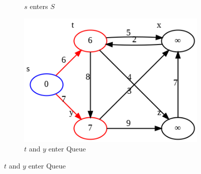 \documentclass[../main.tex]{subfiles}
\begin{document}
\begin{figure}[!ht]
\begin{subfigure}{.32\textwidth}
    \caption{$s$ enters $S$}
    \end{subfigure}
    \begin{subfigure}{.32\textwidth}
    \includegraphics[width=0.99\columnwidth]{fig/dijkstra_1.png}
    \caption{$t$ and $y$ enter Queue}
    \end{subfigure}
    


\end{figure}
\end{document}
